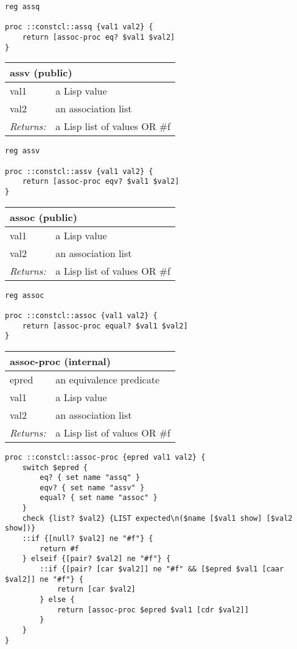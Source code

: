 \documentclass{report}
\begin{document}
\noindent\makebox[\linewidth]{\rule{\linewidth}{0.4pt}}
\begin{lstlisting}
reg assq
 
proc ::constcl::assq {val1 val2} {
    return [assoc-proc eq? $val1 $val2]
}
\end{lstlisting}
\noindent\makebox[\linewidth]{\rule{\linewidth}{0.4pt}}
\begin{tabular}{ |l l| }
\hline
\multicolumn{2}{|l|}{assv (public)} \\
\hline
val1 & a Lisp value \\
val2 & an association list \\
\textit{Returns:} & a Lisp list of values OR \#f \\
\hline
\end{tabular}

\noindent\makebox[\linewidth]{\rule{\linewidth}{0.4pt}}
\begin{lstlisting}
reg assv
 
proc ::constcl::assv {val1 val2} {
    return [assoc-proc eqv? $val1 $val2]
}
\end{lstlisting}
\noindent\makebox[\linewidth]{\rule{\linewidth}{0.4pt}}
\begin{tabular}{ |l l| }
\hline
\multicolumn{2}{|l|}{assoc (public)} \\
\hline
val1 & a Lisp value \\
val2 & an association list \\
\textit{Returns:} & a Lisp list of values OR \#f \\
\hline
\end{tabular}

\noindent\makebox[\linewidth]{\rule{\linewidth}{0.4pt}}
\begin{lstlisting}
reg assoc
 
proc ::constcl::assoc {val1 val2} {
    return [assoc-proc equal? $val1 $val2]
}
\end{lstlisting}
\noindent\makebox[\linewidth]{\rule{\linewidth}{0.4pt}}
\begin{tabular}{ |l l| }
\hline
\multicolumn{2}{|l|}{assoc-proc (internal)} \\
\hline
epred & an equivalence predicate \\
val1 & a Lisp value \\
val2 & an association list \\
\textit{Returns:} & a Lisp list of values OR \#f \\
\hline
\end{tabular}

\noindent\makebox[\linewidth]{\rule{\linewidth}{0.4pt}}
\begin{lstlisting}
proc ::constcl::assoc-proc {epred val1 val2} {
    switch $epred {
        eq? { set name "assq" }
        eqv? { set name "assv" }
        equal? { set name "assoc" }
    }
    check {list? $val2} {LIST expected\n($name [$val1 show] [$val2 show])}
    ::if {[null? $val2] ne "#f"} {
        return #f
    } elseif {[pair? $val2] ne "#f"} {
        ::if {[pair? [car $val2]] ne "#f" && [$epred $val1 [caar $val2]] ne "#f"} {
            return [car $val2]
        } else {
            return [assoc-proc $epred $val1 [cdr $val2]]
        }
    }
}
\end{lstlisting}
\noindent\makebox[\linewidth]{\rule{\linewidth}{0.4pt}}
\end{document}
